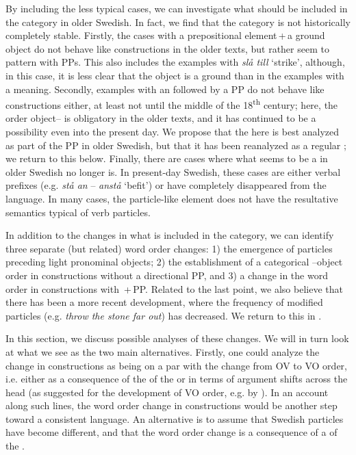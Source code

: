 \documentclass[output=paper]{langscibook}
\begin{document}
By including the less typical cases, we can investigate what should be included in the  category in older Swedish. In fact, we find that the category is not historically completely stable. Firstly, the cases with a prepositional element\,+\,a ground object do not behave like  constructions in the older texts, but rather seem to pattern with PPs. This also includes the examples with \textit{slå till} ‘strike’, although, in this case, it is less clear that the object is a ground than in the examples with a  meaning. Secondly, examples with an  followed by a PP do not behave like  constructions either, at least not until the middle of the 18\textsuperscript{th} century; here, the order object– is obligatory in the older texts, and it has continued to be a possibility even into the present day. We propose that the  here is best analyzed as part of the PP in older Swedish, but that it has been reanalyzed as a regular ; we return to this below. Finally, there are cases where what seems to be a  in older Swedish no longer is. In present-day Swedish, these cases are either verbal prefixes (e.g. \textit{stå an} – \textit{anstå} ‘befit’) or have completely disappeared from the language. In many cases, the particle-like element does not have the resultative semantics typical of verb particles. 



In addition to the changes in what is included in the  category, we can identify three separate (but related) word order changes: 1) the emergence of particles preceding light pronominal objects; 2) the establishment of a categorical –object order in constructions without a directional PP, and 3) a change in the word order in constructions with \,+\,PP. Related to the last point, we also believe that there has been a more recent development, where the frequency of modified particles (e.g. \textit{throw the stone far out}) has decreased. We return to this in .



In this section, we discuss possible analyses of these changes. We will in turn look at what we see as the two main alternatives. Firstly, one could analyze the change in  constructions as being on a par with the change from OV to VO order, i.e. either as a consequence of the  of the  or in terms of argument shifts across the  head (as suggested for the development of VO order, e.g. by \citealt{Petzell2011}). In an account along such lines, the word order change in  constructions would be another step toward a consistent  language. An alternative is to assume that Swedish particles have become different, and that the word order change is a consequence of a  of the . 
\end{document}
